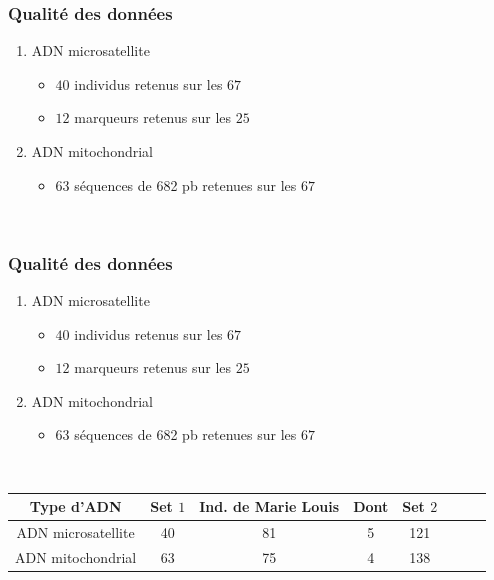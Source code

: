 \documentclass[10pt,xcolor=table]{beamer}\usepackage[]{graphicx}\usepackage[]{color}
\begin{document}
\begin{frame}
	\frametitle{Qualité des données}
\begin{enumerate}
	\item ADN microsatellite
	\begin{itemize}
		\item $40$ individus retenus sur les $67$
		\item $12$ marqueurs retenus sur les $25$
	\end{itemize}
	\item ADN mitochondrial
	\begin{itemize}
		\item $63$ séquences de 682 pb retenues sur les $67$
	\end{itemize}
\end{enumerate}
\\[5.1cm]
\end{frame}


\begin{frame}
	\frametitle{Qualité des données}
\begin{enumerate}
	\item ADN microsatellite
	\begin{itemize}
		\item $40$ individus retenus sur les $67$
		\item $12$ marqueurs retenus sur les $25$
	\end{itemize}
	\item ADN mitochondrial
	\begin{itemize}
		\item $63$ séquences de 682 pb retenues sur les $67$
	\end{itemize}
\end{enumerate}
\\[2cm]


\begin{table}	
\begin{tabular}{cccccccc}
  \hline
  Type d'ADN & Set $1$ & Ind. de Marie Louis & Dont & Set $2$ \\
  \hline
 ADN microsatellite & 40 & 81 & 5 & 121\\
 ADN mitochondrial  & 63 & 75 & 4 & 138 \\
  \hline
\end{tabular}
\end{table}

\\[5.1cm]
\end{frame}
\end{document}
